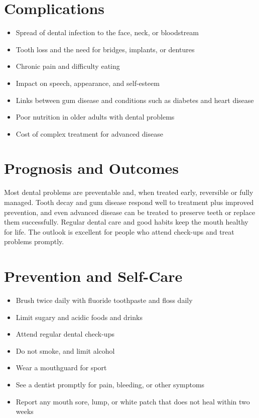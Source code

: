 \section*{Complications}
\begin{itemize}
    \item Spread of dental infection to the face, neck, or bloodstream
    \item Tooth loss and the need for bridges, implants, or dentures
    \item Chronic pain and difficulty eating
    \item Impact on speech, appearance, and self-esteem
    \item Links between gum disease and conditions such as diabetes and heart disease
    \item Poor nutrition in older adults with dental problems
    \item Cost of complex treatment for advanced disease
\end{itemize}

\section*{Prognosis and Outcomes}
Most dental problems are preventable and, when treated early, reversible or fully managed. Tooth decay and gum disease respond well to treatment plus improved prevention, and even advanced disease can be treated to preserve teeth or replace them successfully. Regular dental care and good habits keep the mouth healthy for life. The outlook is excellent for people who attend check-ups and treat problems promptly.

\section*{Prevention and Self-Care}
\begin{itemize}
    \item Brush twice daily with fluoride toothpaste and floss daily
    \item Limit sugary and acidic foods and drinks
    \item Attend regular dental check-ups
    \item Do not smoke, and limit alcohol
    \item Wear a mouthguard for sport
    \item See a dentist promptly for pain, bleeding, or other symptoms
    \item Report any mouth sore, lump, or white patch that does not heal within two weeks
\end{itemize}

